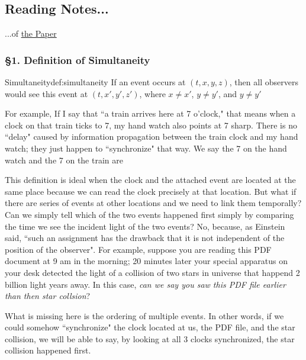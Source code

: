 \subsection{Reading Notes...}

...of \hyperlink{sr-original-paper}{the Paper}

\subsubsection{\hfil \S1. Definition of Simultaneity \hfil}

\begin{Definition}{Simultaneity}{def:simultaneity}
    If an event occurs at $(t, x, y, z)$, then all observers would see this event at $(t, x', y', z')$, where
    $x \ne x'$, $y \ne y'$, and $y \ne y'$
\end{Definition}

For example, If I say that ``a train arrives here at 7 o'clock," that means when a clock on that train ticks to 7, my
hand watch also points at 7 sharp. There is no ``delay" caused by information propagation between the train clock and my
hand watch; they just happen to ``synchronize" that way. We say the 7 on the hand watch and the 7 on the train are

This definition is ideal when the clock and the attached event are located at the same place because we can read the
clock precisely at that location. But what if there are series of events at other locations and we need to link them
temporally? Can we simply tell which of the two events happened first simply by comparing the time we see the incident
light of the two events? No, because, as Einstein said, ``such an assignment has the drawback that it is not independent
of the position of the observer". For example, suppose you are reading this PDF document at 9 am in the morning; 20
minutes later your special apparatus on your desk detected the light of a collision of two stars in universe that
happend 2 billion light years away. In this case, \textit{can we say you saw this PDF file earlier than then star
collsion}?

What is missing here is the ordering of multiple events. In other words, if we could somehow ``synchronize" the clock
located at us, the PDF file, and the star collision, we will be able to say, by looking at all 3 clocks synchronized,
the star collision happened first.

